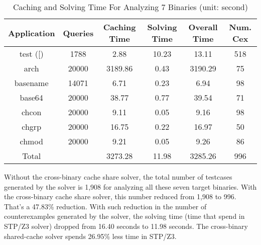\begin{table}[ht]
\begin{tabular}{cccccc}
\hline
\multicolumn{1}{|c|}{Application} & \multicolumn{1}{c|}{Queries} & \multicolumn{1}{c|}{Caching Time} & \multicolumn{1}{c|}{Solving Time} & \multicolumn{1}{c|}{Overall Time} & \multicolumn{1}{c|}{Num. Cex} \\ \hline
\multicolumn{1}{|c|}{{test ([)}}      & \multicolumn{1}{c|}{1788}  & \multicolumn{1}{c|}{2.88}    & \multicolumn{1}{c|}{10.23} & \multicolumn{1}{c|}{13.11}   & \multicolumn{1}{c|}{518} \\ \hline
\multicolumn{1}{|c|}{arch}     & \multicolumn{1}{c|}{20000} & \multicolumn{1}{c|}{3189.86} & \multicolumn{1}{c|}{0.43}  & \multicolumn{1}{c|}{3190.29} & \multicolumn{1}{c|}{75}  \\ \hline
\multicolumn{1}{|c|}{basename} & \multicolumn{1}{c|}{14071} & \multicolumn{1}{c|}{6.71}    & \multicolumn{1}{c|}{0.23}  & \multicolumn{1}{c|}{6.94}    & \multicolumn{1}{c|}{98}  \\ \hline
\multicolumn{1}{|c|}{base64}   & \multicolumn{1}{c|}{20000} & \multicolumn{1}{c|}{38.77}   & \multicolumn{1}{c|}{0.77}  & \multicolumn{1}{c|}{39.54}   & \multicolumn{1}{c|}{71}  \\ \hline
\multicolumn{1}{|c|}{chcon}    & \multicolumn{1}{c|}{20000} & \multicolumn{1}{c|}{9.11}    & \multicolumn{1}{c|}{0.05}  & \multicolumn{1}{c|}{9.16}    & \multicolumn{1}{c|}{98}  \\ \hline
\multicolumn{1}{|c|}{chgrp}    & \multicolumn{1}{c|}{20000} & \multicolumn{1}{c|}{16.75}   & \multicolumn{1}{c|}{0.22}  & \multicolumn{1}{c|}{16.97}   & \multicolumn{1}{c|}{50}  \\ \hline
\multicolumn{1}{|c|}{chmod}    & \multicolumn{1}{c|}{20000} & \multicolumn{1}{c|}{9.21}    & \multicolumn{1}{c|}{0.05}  & \multicolumn{1}{c|}{9.26}    & \multicolumn{1}{c|}{86}  \\ \hline
Total                          &                            & 3273.28                      & 11.98                      & 3285.26                      & 996
\end{tabular}
\caption{Caching and Solving Time For Analyzing 7 Binaries (unit: second)}
\label{combine_run}
\end{table}

Without the cross-binary cache share solver, the total number of testcases generated by the solver is 1,908 for analyzing all these seven target binaries. With the cross-binary cache share solver, this number reduced from 1,908 to 996. That's a 47.83\% reduction. With such reduction in the number of counterexamples generated by the solver, the solving time (time that spend in STP/Z3 solver) dropped from 16.40 seconds to 11.98 seconds. The cross-binary shared-cache solver spends 26.95\% less time in STP/Z3.

